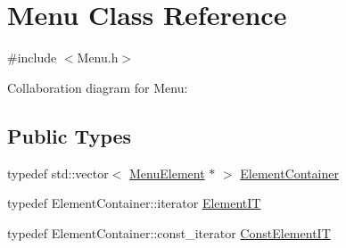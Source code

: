 \hypertarget{classMenu}{}\section{Menu Class Reference}
\label{classMenu}


{\ttfamily \#include $<$Menu.\+h$>$}



Collaboration diagram for Menu\+:
\subsection*{Public Types}
\begin{DoxyCompactItemize}
\item 
typedef std\+::vector$<$ \hyperlink{classMenuElement}{Menu\+Element} $\ast$ $>$ \hyperlink{classMenu_af1e1ac12e9eab661af646964b15edf54}{Element\+Container}
\item 
typedef Element\+Container\+::iterator \hyperlink{classMenu_a9c09c2ca104d7a3cb725d140d3f752f2}{Element\+IT}
\item 
typedef Element\+Container\+::const\+\_\+iterator \hyperlink{classMenu_a5dc61431574d6de0558ba3e6c33fcfb8}{Const\+Element\+IT}
\end{DoxyCompactItemize}
